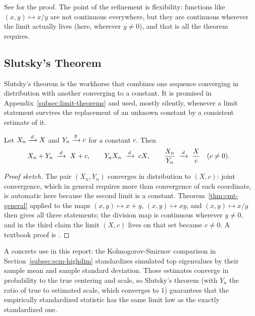 See \citet[\S\S 25 and 29]{Billingsley1995} for the proof. The point of the refinement is flexibility: functions like \((x, y) \mapsto x/y\) are not continuous everywhere, but they are continuous wherever the limit actually lives (here, wherever \(y \ne 0\)), and that is all the theorem requires.

\subsection{Slutsky's Theorem}\label{app:slutsky}

Slutsky's theorem is the workhorse that combines one sequence converging in distribution with another converging to a constant. It is promised in Appendix~\ref{subsec:limit-theorems} and used, mostly silently, whenever a limit statement survives the replacement of an unknown constant by a consistent estimate of it.

\begin{theorem}\label{thm:slutsky}
Let \(X_n \xrightarrow{\,d\,} X\) and \(Y_n \xrightarrow{\,\mathbb{P}\,} c\) for a constant \(c\). Then
\[
  X_n + Y_n \;\xrightarrow{\,d\,}\; X + c,
  \qquad
  Y_n X_n \;\xrightarrow{\,d\,}\; c X,
  \qquad
  \frac{X_n}{Y_n} \;\xrightarrow{\,d\,}\; \frac{X}{c} \quad (c \ne 0).
\]
\end{theorem}

\begin{proof}[Proof sketch]
The pair \((X_n, Y_n)\) converges in distribution to \((X, c)\): joint convergence, which in general requires more than convergence of each coordinate, is automatic here because the second limit is a constant. Theorem~\ref{thm:cmt-general} applied to the maps \((x, y) \mapsto x + y\), \((x, y) \mapsto xy\), and \((x, y) \mapsto x/y\) then gives all three statements; the division map is continuous wherever \(y \ne 0\), and in the third claim the limit \((X, c)\) lives on that set because \(c \ne 0\). A textbook proof is \citet[Thm.~5.5.17]{Casella2002}.
\end{proof}

A concrete use in this report: the Kolmogorov-Smirnov comparison in Section~\ref{subsec:scm-highdim} standardizes simulated top eigenvalues by their sample mean and sample standard deviation. Those estimates converge in probability to the true centering and scale, so Slutsky's theorem (with \(Y_n\) the ratio of true to estimated scale, which converges to \(1\)) guarantees that the empirically standardized statistic has the same limit law as the exactly standardized one.

\clearpage
